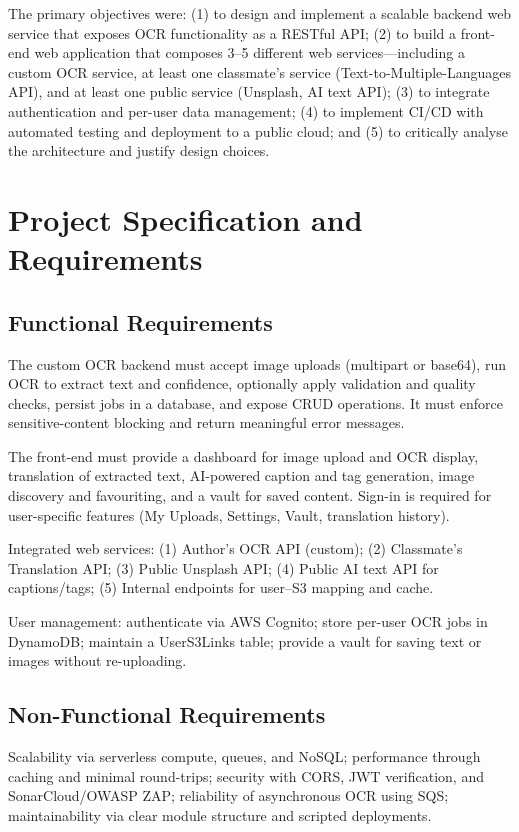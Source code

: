\documentclass[conference]{IEEEtran}
\begin{document}
The primary objectives were: (1) to design and implement a scalable backend web service that exposes OCR functionality as a RESTful API; (2) to build a front-end web application that composes 3--5 different web services---including a custom OCR service, at least one classmate's service (Text-to-Multiple-Languages API), and at least one public service (Unsplash, AI text API); (3) to integrate authentication and per-user data management; (4) to implement CI/CD with automated testing and deployment to a public cloud; and (5) to critically analyse the architecture and justify design choices.

\section{Project Specification and Requirements}

\subsection{Functional Requirements}
The custom OCR backend must accept image uploads (multipart or base64), run OCR to extract text and confidence, optionally apply validation and quality checks, persist jobs in a database, and expose CRUD operations. It must enforce sensitive-content blocking and return meaningful error messages.

The front-end must provide a dashboard for image upload and OCR display, translation of extracted text, AI-powered caption and tag generation, image discovery and favouriting, and a vault for saved content. Sign-in is required for user-specific features (My Uploads, Settings, Vault, translation history).

Integrated web services: (1) Author's OCR API (custom); (2) Classmate's Translation API; (3) Public Unsplash API; (4) Public AI text API for captions/tags; (5) Internal endpoints for user--S3 mapping and cache.

User management: authenticate via AWS Cognito; store per-user OCR jobs in DynamoDB; maintain a UserS3Links table; provide a vault for saving text or images without re-uploading.

\subsection{Non-Functional Requirements}
Scalability via serverless compute, queues, and NoSQL; performance through caching and minimal round-trips; security with CORS, JWT verification, and SonarCloud/OWASP ZAP; reliability of asynchronous OCR using SQS; maintainability via clear module structure and scripted deployments.
\end{document}
